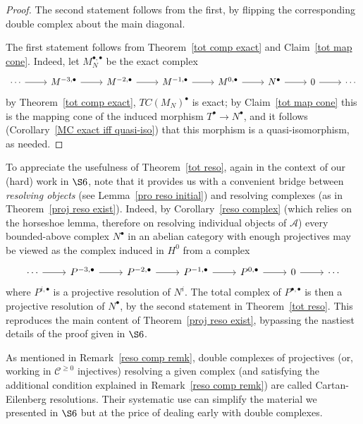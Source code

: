 \begin{proof}
The second statement follows from the first, by flipping the corresponding
double complex about the main diagonal.\par
The first statement follows from Theorem~\ref{tot comp exact} and Claim~\ref{tot map cone}. Indeed, let $M^{\bullet,\bullet}_N$ be the exact complex
\[\begin{tikzcd}
\cdots\ar[r]&M^{-3,\bullet}\ar[r]&M^{-2,\bullet}\ar[r]&M^{-1,\bullet}\ar[r]&M^{0,\bullet}\ar[r]&N^\bullet\ar[r]&0\ar[r]&\cdots
\end{tikzcd}\]
by Theorem~\ref{tot comp exact}, $TC(M_N)^\bullet$ is exact; by Claim~\ref{tot map cone} this is the mapping cone of the induced morphism $T^\bullet\to N^\bullet$, and it follows (Corollary~\ref{MC exact iff quasi-iso}) that this morphism is a quasi-isomorphism, as needed.
\end{proof}
To appreciate the usefulness of Theorem~\ref{tot reso}, again in the context of our (hard) work in $\S6$, note that it provides us with a convenient bridge between \textit{resolving objects} (see Lemma~\ref{pro reso initial}) and resolving complexes (as in Theorem~\ref{proj reso exist}). Indeed, by Corollary~\ref{reso complex} (which relies on the horseshoe lemma, therefore on resolving individual objects of $\mathcal{A}$) every bounded-above complex $N^\bullet$ in an abelian category with enough projectives may be viewed as the complex induced in $H^0$ from a complex
\[\begin{tikzcd}
\cdots\ar[r]&P^{-3,\bullet}\ar[r]&P^{-2,\bullet}\ar[r]&P^{-1,\bullet}\ar[r]&P^{0,\bullet}\ar[r]&0\ar[r]&\cdots
\end{tikzcd}\]
where $P^{i,\bullet}$ is a projective resolution of $N^i$. The total complex of $P^{\bullet,\bullet}$ is then a projective resolution of $N^\bullet$, by the second statement in Theorem~\ref{tot reso}. This
reproduces the main content of Theorem~\ref{proj reso exist}, bypassing the nastiest details of the proof given in $\S6$.\par
As mentioned in Remark~\ref{reso comp remk}, double complexes of projectives (or, working in $\mathcal{C}^{\geq0}$ injectives) resolving a given complex (and satisfying the additional condition explained in Remark~\ref{reso comp remk}) are called Cartan-Eilenberg resolutions. Their systematic use can simplify the material we presented in $\S6$ but at the price of dealing early with double complexes.
